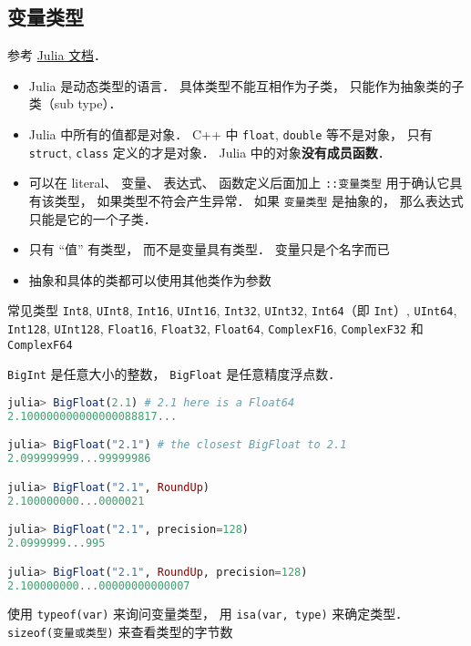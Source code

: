 
\begin{issues}
\issueDraft
\end{issues}

\subsection{变量类型}

参考 \href{https://docs.julialang.org/en/v1/manual/types/#man-declared-types}{Julia 文档}．
\begin{itemize}
\item Julia 是动态类型的语言． 具体类型不能互相作为子类， 只能作为抽象类的子类（sub type）．
\item Julia 中所有的值都是对象． C++ 中 \verb|float|, \verb|double| 等不是对象， 只有 \verb|struct|, \verb|class| 定义的才是对象． Julia 中的对象\textbf{没有成员函数}．
\item 可以在 literal、 变量、 表达式、 函数定义后面加上 \verb|::变量类型| 用于确认它具有该类型， 如果类型不符会产生异常． 如果 \verb|变量类型| 是抽象的， 那么表达式只能是它的一个子类．
\item 只有 “值” 有类型， 而不是变量具有类型． 变量只是个名字而已
\item 抽象和具体的类都可以使用其他类作为参数
\end{itemize}

常见类型
\verb|Int8|, \verb|UInt8|, \verb|Int16|, \verb|UInt16|, \verb|Int32|, \verb|UInt32|, \verb|Int64|（即 \verb|Int|）, \verb|UInt64|, \verb|Int128|, \verb|UInt128|, \verb|Float16|, \verb|Float32|, \verb|Float64|, \verb|ComplexF16|, \verb|ComplexF32| 和 \verb|ComplexF64|

\verb|BigInt| 是任意大小的整数， \verb|BigFloat| 是任意精度浮点数．

\begin{lstlisting}[language=julia]
julia> BigFloat(2.1) # 2.1 here is a Float64
2.100000000000000088817...

julia> BigFloat("2.1") # the closest BigFloat to 2.1
2.099999999...99999986

julia> BigFloat("2.1", RoundUp)
2.100000000...0000021

julia> BigFloat("2.1", precision=128)
2.0999999...995

julia> BigFloat("2.1", RoundUp, precision=128)
2.100000000...00000000000007
\end{lstlisting}

使用 \verb|typeof(var)| 来询问变量类型， 用 \verb|isa(var, type)| 来确定类型． \verb|sizeof(变量或类型)| 来查看类型的字节数

